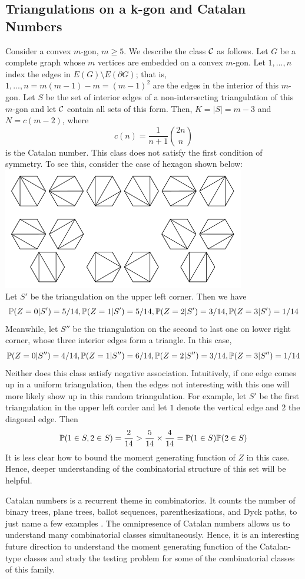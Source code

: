 \documentclass[10pt, oneside]{article}
\begin{document}
\subsection{Triangulations on a k-gon and Catalan Numbers}
Consider a convex $m$-gon, $m \ge 5$. We describe the class ${\mathcal C}$ as follows. Let $G$ be a complete graph whose $m$ vertices are embedded on a convex $m$-gon. Let $1,...,n$ index the edges in $E(G)\setminus E(\partial G)$; that is, $1,..., n = m(m-1) - m = (m-1)^2$ are the edges in the interior of this $m$-gon. Let $S$ be the set of interior edges of a non-intersecting triangulation of this $m$-gon and let ${\mathcal C}$ contain all sets of this form. Then,
$K = |S| = m - 3$ and $N = c(m-2)$, where $$c(n) = \frac{1}{n+1}\binom{2n}{n}$$
is the Catalan number. This class does not satisfy the first condition of symmetry. To see this, consider the case of hexagon shown below:\\
\includegraphics{hexagon.png}\\
Let $S'$ be the triangulation on the upper left corner. Then we have 
$$\mathbb{P}(Z = 0|S') = 5/14, \mathbb{P}(Z = 1|S') = 5/14, \mathbb{P}(Z = 2|S') = 3/14, \mathbb{P}(Z = 3|S') = 1/14$$
Meanwhile, let $S''$ be the triangulation on the second to last one on lower right corner, whose three interior edges form a triangle. In this case,
$$\mathbb{P}(Z = 0|S'') = 4/14, \mathbb{P}(Z = 1|S'') = 6/14, \mathbb{P}(Z = 2|S'') = 3/14, \mathbb{P}(Z = 3|S'') = 1/14$$
Neither does this class satisfy negative association. Intuitively, if one edge comes up in a uniform triangulation, then the edges not interesting with this one will more likely show up in this random triangulation. For example, let $S'$ be the first triangulation in the upper left corder and let $1$ denote the vertical edge and $2$ the diagonal edge. Then
$$\mathbb{P}(1 \in S, 2 \in S) = \frac{2}{14} > \frac{5}{14} \times \frac{4}{14} = \mathbb{P}(1 \in S)\mathbb{P}(2 \in S) $$
It is less clear how to bound the moment generating function of $Z$ in this case. Hence, deeper understanding of the combinatorial structure of this set will be helpful.

Catalan numbers is a recurrent theme in combinatorics. It counts the number of binary trees, plane trees, ballot sequences, parenthesizations, and Dyck paths, to just name a few examples \cite{stanley2015catalan}. The omnipresence of Catalan numbers allows us to understand many combinatorial classes simultaneously. Hence, it is an interesting future direction to understand the moment generating function of the Catalan-type classes and study the testing problem for some of the combinatorial classes of this family. 


\end{document}
